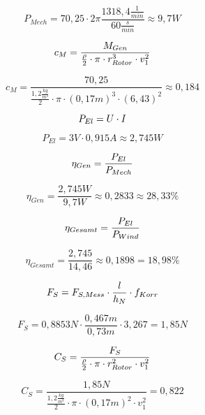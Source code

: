 $$P_{Mech} = 70,25 \cdot 2 \pi \frac{1318,4 \frac{1}{min}}{60\frac{s}{min}} \approx 9,7W$$

\begin{equation}
    \centering
    c_M = \frac{M_{Gen}}{ \frac{\rho}{2} \cdot \pi \cdot r_{Rotor}^3 \cdot v_1^2}
    \label{eq:230615_Momentenbeiwert}
\end{equation}

$$c_M = \frac{70,25}{ \frac{1,2 \frac{kg}{m^3}}{2} \cdot \pi \cdot (0,17 m)^3 \cdot (6,43)^2}\approx 0,184$$

\begin{equation}
    \centering
    P_{El} = U \cdot I
    \label{eq:230615_Elektrische_Leistung}
\end{equation}

$$P_{El} = 3V \cdot 0,915A \approx 2,745W$$



\begin{equation}
    \centering
    \eta_{Gen} = \frac{P_{El}}{P_{Mech}}
    \label{eq:230615_Generatorwirkungsgrad}
\end{equation}

$$\eta_{Gen} = \frac{2,745W}{9,7W} \approx 0,2833 \approx 28,33\% $$

\begin{equation}
    \centering
    \eta_{Gesamt} = \frac{P_{El}}{P_{Wind}}
    \label{eq:230615_Gesamtwirkungsgrad}
\end{equation}

$$\eta_{Gesamt} = \frac{2,745}{14,46}\approx 0,1898 = 18,98\%$$

\begin{equation}
    \centering
    F_S = F_{S,Mess} \cdot \frac{l}{h_N} \cdot f_{Korr}
    \label{eq:230615_Schubkraft}
\end{equation}

$$F_S = 0,8853N \cdot \frac{0,467m}{0,73m} \cdot 3,267 = 1,85N$$

\begin{equation}
    \centering
    C_S = \frac{F_S}{\frac{\rho}{2} \cdot \pi \cdot r_{Rotor}^2 \cdot v_1^2}
    \label{eq:230615_Schubbeiwert}
\end{equation}

$$C_S = \frac{1,85N}{\frac{1,2 \frac{kg}{m^3}}{2} \cdot \pi \cdot (0,17 m)^2 \cdot v_1^2} = 0,822$$
